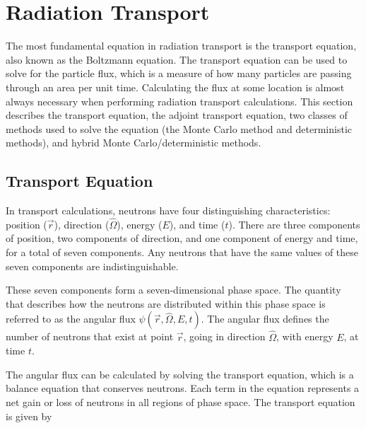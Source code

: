 \section{Radiation Transport}
\label{sec:bg:rt}

The most fundamental equation in radiation transport is the transport equation, also known as the Boltzmann equation.
The transport equation can be used to solve for the particle flux, which is a measure of how many particles are passing through an area per unit time.
Calculating the flux at some location is almost always necessary when performing radiation transport calculations.
This section describes the transport equation, the adjoint transport equation, two classes of methods used to solve the equation (the Monte Carlo method and deterministic methods), and hybrid Monte Carlo/deterministic methods.

\subsection{Transport Equation}
\label{sec:bg:rt:te}

In transport calculations, neutrons have four distinguishing characteristics: position ($\vec{r}$), direction ($\hat{\Omega}$), energy ($E$), and time ($t$).
There are three components of position, two components of direction, and one component of energy and time, for a total of seven components.
Any neutrons that have the same values of these seven components are indistinguishable.

These seven components form a seven-dimensional phase space.
The quantity that describes how the neutrons are distributed within this phase space is referred to as the angular flux $\psi\left(\vec{r},\hat{\Omega},E,t\right)$.
The angular flux defines the number of neutrons that exist at point $\vec{r}$, going in direction ${\hat{\Omega}}$, with energy $E$, at time $t$.

The angular flux can be calculated by solving the transport equation, which is a balance equation that conserves neutrons.
Each term in the equation represents a net gain or loss of neutrons in all regions of phase space.
The transport equation is given by

